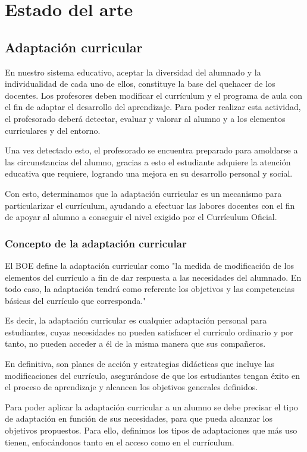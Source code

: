 \chapter{Estado del arte}
\label{cap:estadoDelArte}

\section{Adaptación curricular}
En nuestro sistema educativo, aceptar la diversidad del alumnado y la individualidad de cada uno de ellos, constituye la base del quehacer de los docentes. Los profesores deben modificar el currículum y el programa de aula con el fin de adaptar el desarrollo del aprendizaje. Para poder realizar esta actividad, el profesorado deberá detectar, evaluar y valorar al alumno y a los elementos curriculares y del entorno.

Una vez detectado esto, el profesorado se encuentra preparado para amoldarse a las circunstancias del alumno, gracias a esto el estudiante adquiere la atención educativa que requiere, logrando una mejora en su desarrollo personal y social.

Con esto, determinamos que la adaptación curricular es un mecanismo para particularizar el currículum, ayudando a efectuar las labores docentes con el fin de apoyar al alumno a conseguir el nivel exigido por el Currículum Oficial.

\subsection{Concepto de la adaptación curricular}
El BOE define la adaptación curricular como "la medida de modificación de los elementos del currículo a fin de dar respuesta a las necesidades del alumnado. En todo caso, la adaptación tendrá como referente los objetivos y las competencias básicas del currículo que corresponda."

Es decir, la adaptación curricular es cualquier adaptación personal para estudiantes, cuyas necesidades no pueden satisfacer el currículo ordinario y por tanto, no pueden acceder a él de la misma manera que sus compañeros.

En definitiva, son planes de acción y estrategias didácticas que incluye las modificaciones del currículo, asegurándose de que los estudiantes tengan éxito en el proceso de aprendizaje y alcancen los objetivos generales definidos.

Para poder aplicar la adaptación curricular a un alumno se debe precisar el tipo de adaptación en función de sus necesidades, para que pueda alcanzar los objetivos propuestos. Para ello, definimos los tipos de adaptaciones que más uso tienen, enfocándonos tanto en el acceso como en el currículum. 

